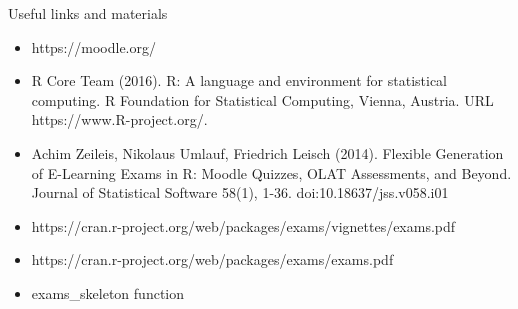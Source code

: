 \documentclass[10pt]{beamer}
\begin{document}
\begin{frame}{Useful links and materials}
\begin{itemize}
\item https://moodle.org/
\item R Core Team (2016). R: A language and environment for statistical computing. R Foundation for Statistical Computing,
  Vienna, Austria. URL https://www.R-project.org/.
\item Achim Zeileis, Nikolaus Umlauf, Friedrich Leisch (2014). Flexible Generation of E-Learning Exams in R: Moodle Quizzes,
  OLAT Assessments, and Beyond. Journal of Statistical Software 58(1), 1-36. doi:10.18637/jss.v058.i01
\item https://cran.r-project.org/web/packages/exams/vignettes/exams.pdf
\item https://cran.r-project.org/web/packages/exams/exams.pdf
\item exams\_skeleton function
\end{itemize}
\end{frame}
\end{document}
